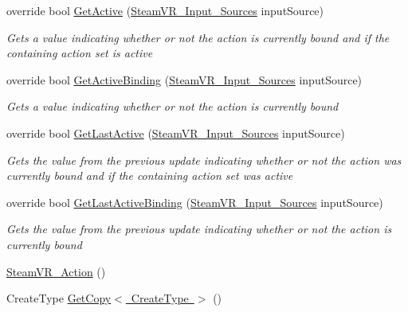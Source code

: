 \begin{DoxyCompactItemize}
override bool \mbox{\hyperlink{class_valve_1_1_v_r_1_1_steam_v_r___action_a76c9b93e06e87e5fa861423bd4102c4c}{Get\+Active}} (\mbox{\hyperlink{namespace_valve_1_1_v_r_a82e5bf501cc3aa155444ee3f0662853f}{Steam\+V\+R\+\_\+\+Input\+\_\+\+Sources}} input\+Source)
\begin{DoxyCompactList}\small\item\em Gets a value indicating whether or not the action is currently bound and if the containing action set is active \end{DoxyCompactList}\item 
override bool \mbox{\hyperlink{class_valve_1_1_v_r_1_1_steam_v_r___action_adb510f6f020a3023d6bbfa59110edf58}{Get\+Active\+Binding}} (\mbox{\hyperlink{namespace_valve_1_1_v_r_a82e5bf501cc3aa155444ee3f0662853f}{Steam\+V\+R\+\_\+\+Input\+\_\+\+Sources}} input\+Source)
\begin{DoxyCompactList}\small\item\em Gets a value indicating whether or not the action is currently bound \end{DoxyCompactList}\item 
override bool \mbox{\hyperlink{class_valve_1_1_v_r_1_1_steam_v_r___action_a24bb49705ffd97a432add0cb2233ff91}{Get\+Last\+Active}} (\mbox{\hyperlink{namespace_valve_1_1_v_r_a82e5bf501cc3aa155444ee3f0662853f}{Steam\+V\+R\+\_\+\+Input\+\_\+\+Sources}} input\+Source)
\begin{DoxyCompactList}\small\item\em Gets the value from the previous update indicating whether or not the action was currently bound and if the containing action set was active \end{DoxyCompactList}\item 
override bool \mbox{\hyperlink{class_valve_1_1_v_r_1_1_steam_v_r___action_a9f6a753a369e7932e99aebd540bdf886}{Get\+Last\+Active\+Binding}} (\mbox{\hyperlink{namespace_valve_1_1_v_r_a82e5bf501cc3aa155444ee3f0662853f}{Steam\+V\+R\+\_\+\+Input\+\_\+\+Sources}} input\+Source)
\begin{DoxyCompactList}\small\item\em Gets the value from the previous update indicating whether or not the action is currently bound \end{DoxyCompactList}\item 
\mbox{\hyperlink{class_valve_1_1_v_r_1_1_steam_v_r___action_af433e8fb310a9f16c274341055fe025f}{Steam\+V\+R\+\_\+\+Action}} ()
\item 
Create\+Type \mbox{\hyperlink{class_valve_1_1_v_r_1_1_steam_v_r___action_a641a73a51f3dc9509bbaf48667c47b71}{Get\+Copy$<$ Create\+Type $>$}} ()

\end{DoxyCompactItemize}
